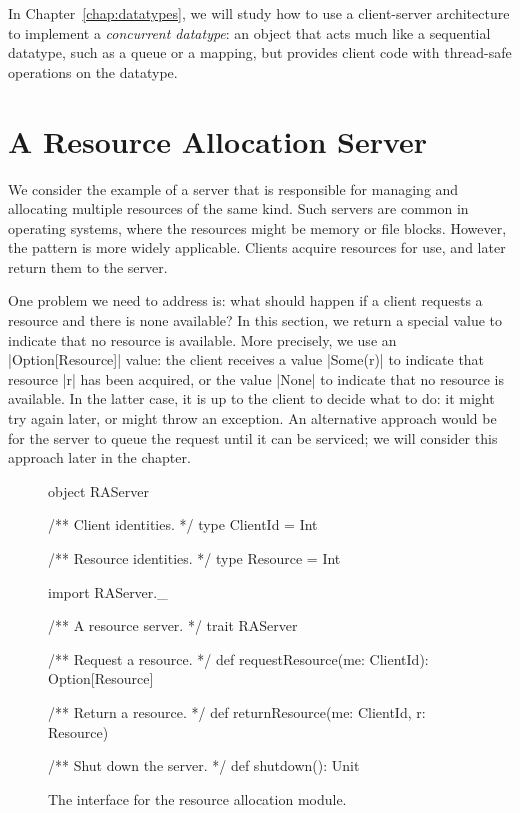 In Chapter~\ref{chap:datatypes}, we will study how to use a client-server
architecture to implement a \emph{concurrent datatype}: an object that acts
much like a sequential datatype, such as a queue or a mapping, but provides
client code with thread-safe operations on the datatype. 


\section{A Resource Allocation Server}

We consider the example of a server that is responsible for managing and
allocating multiple resources of the same kind.  Such servers are common in
operating systems, where the resources might be memory or file blocks.
However, the pattern is more widely applicable.  Clients acquire resources for
use, and later return them to the server.

One problem we need to address is: what should happen if a client requests a
resource and there is none available?  In this section, we return a special
value to indicate that no resource is available.  More precisely, we use an
|Option[Resource]| value: the client receives a value |Some(r)| to indicate
that resource |r| has been acquired, or the value |None| to indicate that no
resource is available.
%
In the latter case, it is up to the client to decide what to do: it might try
again later, or might throw an exception.  
%
An alternative approach would be for the server to queue the request until it
can be serviced; we will consider this approach later in the chapter.


\begin{figure}
\begin{scala}
object RAServer{
  /** Client identities. */
  type ClientId = Int

  /** Resource identities. */
  type Resource = Int
}

import RAServer._

/** A resource server. */
trait RAServer{
  /** Request a resource. */
  def requestResource(me: ClientId): Option[Resource]

  /** Return a resource. */
  def returnResource(me: ClientId, r: Resource) 

  /** Shut down the server. */
  def shutdown(): Unit
} 
\end{scala}
\caption{The interface for the resource allocation module.}
\label{fig:RAServer}
\end{figure}

